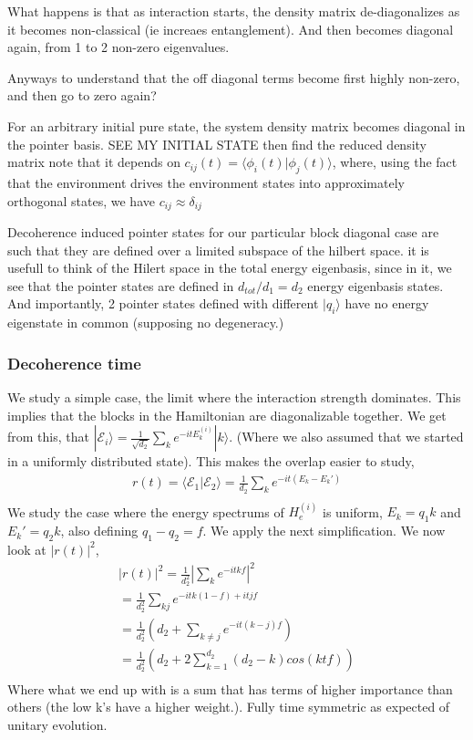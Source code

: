 \documentclass{article}
\begin{document}
What happens is that as interaction starts, the density matrix de-diagonalizes as it becomes non-classical (ie increaes entanglement). And then becomes diagonal again, from 1 to 2 non-zero eigenvalues. 

Anyways to understand that the off diagonal terms become first highly non-zero, and then go to zero again?


For an arbitrary initial pure state, the system density matrix becomes diagonal in the pointer basis.
SEE MY INITIAL STATE
then find the reduced density matrix
note that it depends on $c_{ij}(t)=\langle \phi_i(t)|\phi_j(t) \rangle$, where, using the fact that the environment drives the environment states into approximately orthogonal states, we have $c_{ij}\approx \delta_{ij}$




Decoherence induced pointer states for our particular block diagonal case are such that they are defined over a limited subspace of the hilbert space. it is usefull to think of the Hilert space in the total energy eigenbasis, since in it, we see that the pointer states are defined in $d_{tot}/d_1=d_2$ energy eigenbasis states. And importantly, 2 pointer states defined with different $|q_i\rangle$ have no energy eigenstate in common (supposing no degeneracy.)

\subsubsection{Decoherence time}

We study a simple case, the limit where the interaction strength dominates. This implies that the blocks in the Hamiltonian are diagonalizable together. We get from this, that $|\mathcal{E}_i\rangle=\frac{1}{\sqrt{d_2}}\sum_ke^{-itE^{(i)}_k}|k\rangle$. (Where we also assumed that we started in a uniformly distributed state). This makes the overlap easier to study,
\begin{align}
    r(t)=\langle\mathcal{E}_1|\mathcal{E}_2\rangle = \frac{1}{d_2}\sum_ke^{-it(E_k-E_k')}\\
\end{align}
We study the case where the energy spectrums of $H_e^{(i)}$ is uniform, $E_k=q_1k$ and $E_k'=q_2k$, also defining $q_1-q_2=f$. We apply the next simplification. We now look at $|r(t)|^2$,
\begin{align}
    |r(t)|^2=\frac{1}{d_2^2}|\sum_ke^{-itkf}|^2\\
    =\frac{1}{d_2^2}\sum_{kj}e^{-itk(1-f)+itjf}\\
    =\frac{1}{d_2^2}(d_2+\sum_{k\neq j}e^{-it(k-j)f})\\
    =\frac{1}{d_2^2}(d_2+2\sum^{d_2}_{k=1}(d_2-k)cos(ktf))\\
\end{align}
Where what we end up with is a sum that has terms of higher importance than others (the low k's have a higher weight.). Fully time symmetric as expected of unitary evolution. 
\end{document}
